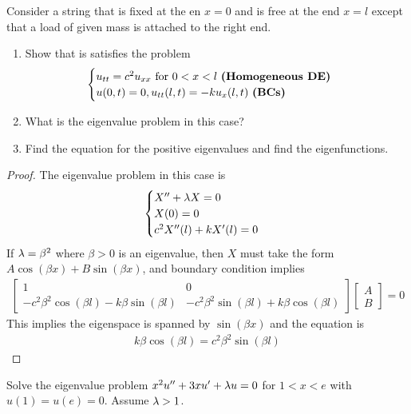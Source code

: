 \documentclass{report}
\begin{document}
\begin{question}{}{}
Consider a string  that is fixed at the en $x=0$ and is free at the end  $x=l$ except that a load of given mass is attached to the right end. 
 \begin{enumerate}[label=(\alph*)]
  \item Show that is satisfies the problem 
    \begin{align*}
    \begin{cases}
      u_{tt}=c^2u_{xx}\text{ for }0<x<l\text{ \textbf{(Homogeneous DE)} }  \\
      u(0,t)=0, u_{tt}(l,t)=-ku_x(l,t)\text{ \textbf{(BCs)} }
    \end{cases}
    \end{align*} 
    \item What is the eigenvalue problem in this case? 
    \item Find the equation for the positive eigenvalues and find the eigenfunctions. 
\end{enumerate}
\end{question}
\begin{proof}
The eigenvalue problem in this case is 
\begin{align*}
\begin{cases}
  X''+ \lambda  X= 0\\
  X(0)=0\\
  c^2 X''(l)+ kX'(l)=0 
\end{cases}
\end{align*}
If $\lambda =\beta ^2$ where $\beta >0$ is an eigenvalue, then $X$ must take the form  $A\cos (\beta x)+B \sin (\beta x)$, and boundary condition implies 
\begin{align*}
\begin{bmatrix}
  1 & 0 \\
  -c^2 \beta ^2 \cos (\beta l) - k \beta  \sin (\beta l) & -c^2 \beta ^2 \sin (\beta l)+ k \beta \cos (\beta l)
\end{bmatrix} \begin{bmatrix}
A \\
B
\end{bmatrix}= 0
\end{align*}
This implies the eigenspace is spanned by $\sin (\beta x)$ and the equation is 
\begin{align*}
k \beta  \cos (\beta l)= c^2 \beta ^2 \sin (\beta l)
\end{align*}
\end{proof}
\begin{question}{}{}
Solve the eigenvalue problem $x^2u''+3xu'+\lambda u=0$ for $1<x<e$ with  $u(1)=u(e)=0$. Assume $\lambda >1$. 
\end{question}
\end{document}
